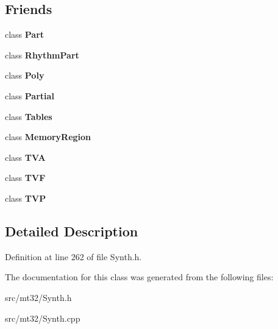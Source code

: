 \subsection*{Friends}
\begin{DoxyCompactItemize}
\item 
\hypertarget{classMT32Emu_1_1Synth_a3c08ef6549488d91ef16ce97b307238f}{class {\bfseries Part}}\label{classMT32Emu_1_1Synth_a3c08ef6549488d91ef16ce97b307238f}

\item 
\hypertarget{classMT32Emu_1_1Synth_a23353a30973b82c223f80761cc22fb8a}{class {\bfseries Rhythm\-Part}}\label{classMT32Emu_1_1Synth_a23353a30973b82c223f80761cc22fb8a}

\item 
\hypertarget{classMT32Emu_1_1Synth_acbff96b7e40de6274dbed4443807678e}{class {\bfseries Poly}}\label{classMT32Emu_1_1Synth_acbff96b7e40de6274dbed4443807678e}

\item 
\hypertarget{classMT32Emu_1_1Synth_a8d43001f303ba9bd15b2f7ea3a0a6322}{class {\bfseries Partial}}\label{classMT32Emu_1_1Synth_a8d43001f303ba9bd15b2f7ea3a0a6322}

\item 
\hypertarget{classMT32Emu_1_1Synth_a30b22fcce1938bbfd9ec78261a9b5452}{class {\bfseries Tables}}\label{classMT32Emu_1_1Synth_a30b22fcce1938bbfd9ec78261a9b5452}

\item 
\hypertarget{classMT32Emu_1_1Synth_a5477c599a40386bf47fa8c23fe790284}{class {\bfseries Memory\-Region}}\label{classMT32Emu_1_1Synth_a5477c599a40386bf47fa8c23fe790284}

\item 
\hypertarget{classMT32Emu_1_1Synth_ae7836856441dbac858fae902616f81c2}{class {\bfseries T\-V\-A}}\label{classMT32Emu_1_1Synth_ae7836856441dbac858fae902616f81c2}

\item 
\hypertarget{classMT32Emu_1_1Synth_ab037537bedc6716f0d1257edc0c0a1fd}{class {\bfseries T\-V\-F}}\label{classMT32Emu_1_1Synth_ab037537bedc6716f0d1257edc0c0a1fd}

\item 
\hypertarget{classMT32Emu_1_1Synth_a313d6fcb4b7fa7ceab71cea030cc2aaf}{class {\bfseries T\-V\-P}}\label{classMT32Emu_1_1Synth_a313d6fcb4b7fa7ceab71cea030cc2aaf}

\end{DoxyCompactItemize}


\subsection{Detailed Description}


Definition at line 262 of file Synth.\-h.



The documentation for this class was generated from the following files\-:\begin{DoxyCompactItemize}
\item 
src/mt32/Synth.\-h\item 
src/mt32/Synth.\-cpp\end{DoxyCompactItemize}
